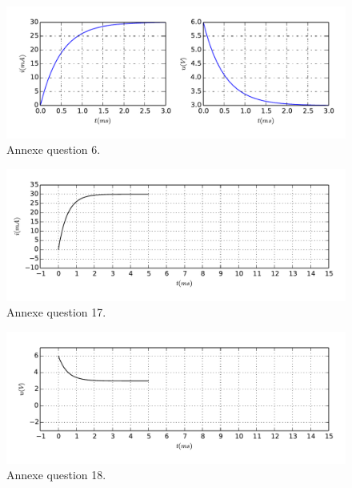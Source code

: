 \documentclass[a4paper, 10pt, garamond, oneside]{book}
\begin{document}
{	\begin{figure}[htbp!]
		\centering
		\includegraphics[width=\linewidth]{transRL_trace.pdf}
		\vspace{-40pt}
		\caption{Annexe question 6.}
		\label{fig:annexe_p2-1}
	\end{figure}
	\begin{figure}[htbp!]
		\centering
		\includegraphics[width=\linewidth]{transRL_tracei.pdf}
		\vspace{-40pt}
		\caption{Annexe question 17.}
		\label{fig:annexe_p2-2}
	\end{figure}
	\begin{figure}[htbp!]
		\centering
		\includegraphics[width=\linewidth]{transRL_traceu.pdf}
		\vspace{-40pt}
		\caption{Annexe question 18.}
		\label{fig:annexe_p2-3}
	\end{figure}

}{
	\newpage
}
\end{document}
